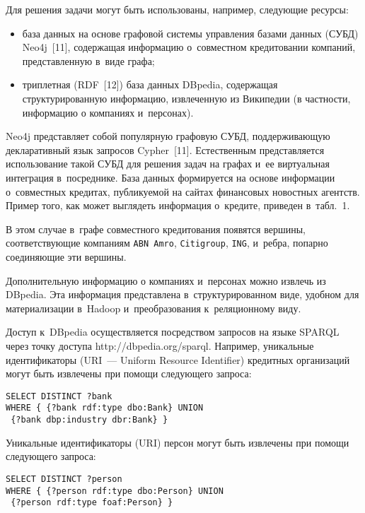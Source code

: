 \begin{multicols}{2}
\vspace*{-2pt}

      Для решения задачи могут быть использованы, например, следующие 
ресурсы:
      \begin{itemize}
\item база данных на основе графовой системы управ\-ления базами данных (СУБД) Neo4j~[11], содержащая 
информацию о~совместном кредитовании компаний, пред\-став\-лен\-ную в~виде 
графа;\\[-15pt]
\item триплетная (RDF~[12]) база данных DBpedia, содержащая 
структурированную информацию, извлеченную из Википедии (в частности, 
информацию о компаниях и~персонах).
\end{itemize}
      
      Neo4j представляет собой популярную графовую СУБД, 
поддерживающую декларативный язык запросов Cypher~[11]. Естественным 
представляется использование такой СУБД для решения задач на графах и~ее 
виртуальная интеграция в~посреднике. База данных формируется на основе 
информации о~совместных кредитах, публикуемой на сайтах финансовых 
новостных агентств. Пример того, как может выглядеть информация о~кредите, 
приведен в~табл.~1.
      

      
      В этом случае в~графе совместного кредитования появятся вершины, 
соответствующие компаниям \verb"ABN Amro", \verb"Citigroup", \verb"ING", 
и~ребра, попарно соединяющие эти вершины.
      
      Дополнительную информацию о компаниях и~персонах можно извлечь 
из DBpedia. Эта информация представлена в~структурированном виде, удобном 
для материализации в~Hadoop и~преобразования к~реляционному виду.
      
      Доступ к~DBpedia осуществляется посредством запросов на языке 
SPARQL через точку доступа {\sf http://dbpedia.org/sparql}. Например, уникальные 
идентификаторы (URI~--- Uniform Resource Identifier) кредитных организаций могут быть извлечены при 
помощи следующего запроса:
      {\small
      \begin{verbatim}
SELECT DISTINCT ?bank
WHERE { {?bank rdf:type dbo:Bank} UNION 
 {?bank dbp:industry dbr:Bank} }
\end{verbatim}
}
      
      Уникальные идентификаторы (URI) персон могут быть извлечены при 
помощи следующего запроса:
      {\small
      \begin{verbatim}
SELECT DISTINCT ?person
WHERE { {?person rdf:type dbo:Person} UNION
 {?person rdf:type foaf:Person} }
\end{verbatim}
}


\end{multicols}
